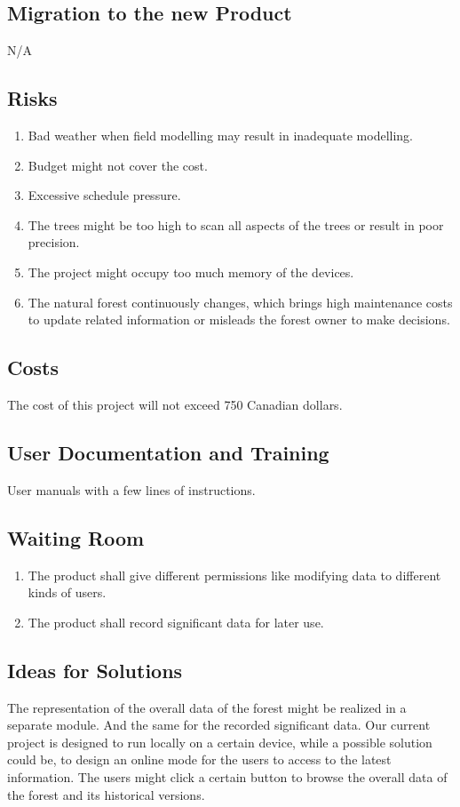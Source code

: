 \documentclass{article}
\begin{document}
\subsection{Migration to the new Product}
N/A
\subsection{Risks}
\begin{enumerate}
    \item Bad weather when field modelling may result in inadequate modelling.
    \item Budget might not cover the cost.
    \item Excessive schedule pressure.
    \item The trees might be too high to scan all aspects of the trees or result in poor precision.
    \item The project might occupy too much memory of the devices.
    \item The natural forest continuously changes, which brings high maintenance costs to update related information or misleads the forest owner to make decisions. 
\end{enumerate}
\subsection{Costs}
The cost of this project will not exceed 750 Canadian dollars.
\subsection{User Documentation and Training}
User manuals with a few lines of instructions. 
\subsection{Waiting Room}
\begin{enumerate}
    \item The product shall give different permissions like modifying data to different kinds of users.
    \item The product shall record significant data for later use.
\end{enumerate}
\subsection{Ideas for Solutions}
The representation of the overall data of the forest might be realized in a separate module. And the same for the recorded significant data. Our current project is designed to run locally on a certain device, while a possible solution could be, to design an online mode for the users to access to the latest information. The users might click a certain button to browse the overall data of the forest and its historical versions. 
\end{document}
